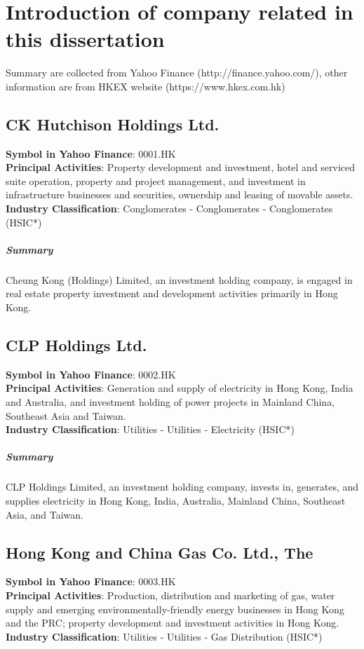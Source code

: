 \chapter{Introduction of company related in this dissertation}
\label{append:stock_info}

Summary are collected from Yahoo Finance (http://finance.yahoo.com/), other information are from HKEX website (https://www.hkex.com.hk)


\section{CK Hutchison Holdings Ltd.}
\textbf{Symbol in Yahoo Finance}: 0001.HK\\
\textbf{Principal Activities}: Property development and investment, hotel and serviced suite operation, property and project management, and investment in infrastructure businesses and securities, ownership and leasing of movable assets.\\
\textbf{Industry Classification}: Conglomerates - Conglomerates - Conglomerates (HSIC*)
\paragraph{Summary}
Cheung Kong (Holdings) Limited, an investment holding company, is engaged in real estate property investment and development activities primarily in Hong Kong.


\section{CLP Holdings Ltd.}
\textbf{Symbol in Yahoo Finance}: 0002.HK\\
\textbf{Principal Activities}: Generation and supply of electricity in Hong Kong, India and Australia, and investment holding of power projects in Mainland China, Southeast Asia and Taiwan.\\
\textbf{Industry Classification}: Utilities - Utilities - Electricity (HSIC*)
\paragraph{Summary}
CLP Holdings Limited, an investment holding company, invests in, generates, and supplies electricity in Hong Kong, India, Australia, Mainland China, Southeast Asia, and Taiwan.


\section{Hong Kong and China Gas Co. Ltd., The}
\textbf{Symbol in Yahoo Finance}: 0003.HK\\
\textbf{Principal Activities}: Production, distribution and marketing of gas, water supply and emerging environmentally-friendly energy businesses in Hong Kong and the PRC; property development and investment activities in Hong Kong.\\
\textbf{Industry Classification}: Utilities - Utilities - Gas Distribution (HSIC*)
